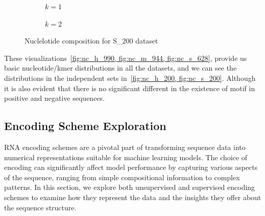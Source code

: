     \begin{figure}[H]
      \centering
      \begin{subfigure}{0.47\textwidth}
        \centering
        \resizebox{\textwidth}{!}{}
        \captionsetup{justification=centering}
        \caption{$k = 1$}
      \end{subfigure}%
      \hspace{0.05\textwidth}
      \begin{subfigure}{0.47\textwidth}
        \centering
        \resizebox{\textwidth}{!}{}
        \captionsetup{justification=centering}
        \caption{$k = 2$}
      \end{subfigure}%
      \caption{Nuclelotide composition for S\_200 dataset}\label{fig:nc_s_200}
    \end{figure}

    These visualizations~\ref{fig:nc_h_990, fig:nc_m_944, fig:nc_s_628}, provide us basic nucleotide/kmer distributions in all the datasets, and we can see the distributions in the independent sets in~\ref{fig:nc_h_200, fig:nc_s_200}.
    Although it is also evident that there is no significant different in the existence of motif in positive and negative sequences.

  \subsection{Encoding Scheme Exploration}\label{subsec:encoding-scheme-exploration}
    RNA encoding schemes are a pivotal part of transforming sequence data into numerical representations suitable for machine learning models.
    The choice of encoding can significantly affect model performance by capturing various aspects of the sequence, ranging from simple compositional information to complex patterns.
    In this section, we explore both unsupervised and supervised encoding schemes to examine how they represent the data and the insights they offer about the sequence structure.

